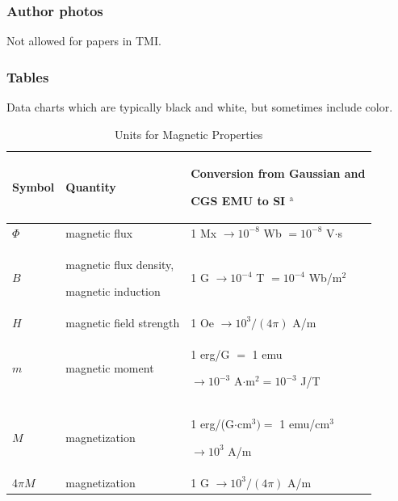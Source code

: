 \documentclass[journal,twoside,web]{ieeecolor}
\begin{document}
\subsubsection{Author photos}
{Not allowed for papers in TMI.}

\subsubsection{Tables}
{Data charts which are typically black and white, but sometimes include
    color.}

\begin{table}
    \caption{Units for Magnetic Properties}
    \label{table}
    \setlength{\tabcolsep}{3pt}
    \begin{tabular}{|p{25pt}|p{75pt}|p{115pt}|}
        \hline
        Symbol                                         &
        Quantity                                       &
        Conversion from Gaussian and \par CGS EMU to SI $^{\mathrm{a}}$                 \\
        \hline
        $\Phi $                                        &
        magnetic flux                                  &
        1 Mx $\to  10^{-8}$ Wb $= 10^{-8}$ V$\cdot $s                                   \\
        $B$                                            &
        magnetic flux density, \par magnetic induction &
        1 G $\to  10^{-4}$ T $= 10^{-4}$ Wb/m$^{2}$                                     \\
        $H$                                            &
        magnetic field strength                        &
        1 Oe $\to  10^{3}/(4\pi )$ A/m                                                  \\
        $m$                                            &
        magnetic moment                                &
        1 erg/G $=$ 1 emu \par $\to 10^{-3}$ A$\cdot $m$^{2} = 10^{-3}$ J/T             \\
        $M$                                            &
        magnetization                                  &
        1 erg/(G$\cdot $cm$^{3}) =$ 1 emu/cm$^{3}$ \par $\to 10^{3}$ A/m                \\
        4$\pi M$                                       &
        magnetization                                  &
        1 G $\to  10^{3}/(4\pi )$ A/m                                                   \\

\end{tabular}
\end{table}
\end{document}
